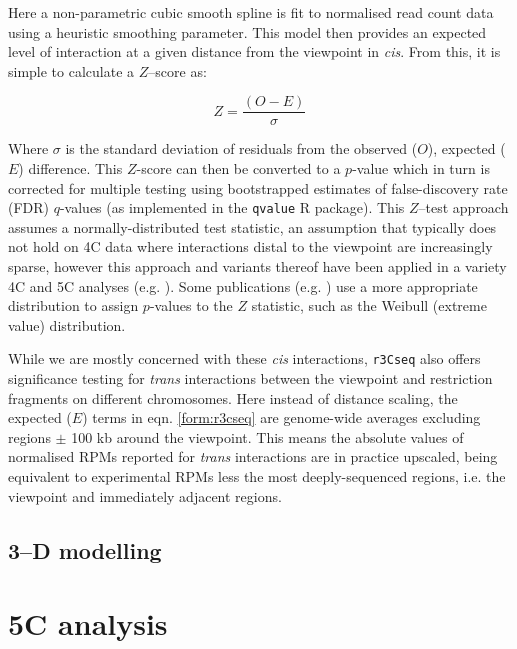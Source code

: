 \documentclass[a4paper,11pt,oneside]{book}
\begin{document}
Here a non-parametric cubic smooth spline is fit to normalised read count data using a heuristic smoothing parameter. This model then provides an expected level of interaction at a given distance from the viewpoint in \emph{cis}. From this, it is simple to calculate a $Z$--score as:

\begin{equation}\label{form:r3cseq}
Z = \frac{(O-E)}{\sigma}
\end{equation}

\noindent Where $\sigma$ is the standard deviation of residuals from the observed ($O$), expected ($E$) difference. This $Z$-score can then be converted to a $p$-value which in turn is corrected for multiple testing using bootstrapped estimates of false-discovery rate (FDR) $q$-values\cite{Storey2004} (as implemented in the \texttt{qvalue} R package\cite{qvalue}). This $Z$--test approach assumes a normally-distributed test statistic, an assumption that typically does not hold on 4C data where interactions distal to the viewpoint are increasingly sparse, however this approach and variants thereof have been applied in a variety 4C and 5C analyses (e.g. ). Some publications (e.g. ) use a more appropriate distribution to assign $p$-values to the $Z$ statistic, such as the Weibull (extreme value) distribution.

While we are mostly concerned with these \emph{cis} interactions, \texttt{r3Cseq} also offers significance testing for \emph{trans} interactions between the viewpoint and restriction fragments on different chromosomes. Here instead of distance scaling, the expected ($E$) terms in eqn. \ref{form:r3cseq} are genome-wide averages excluding regions $\pm$ 100 kb around the viewpoint.\cite{Thongjuea2013} This means the absolute values of normalised RPMs reported for \emph{trans} interactions are in practice upscaled, being equivalent to experimental RPMs less the most deeply-sequenced regions, i.e. the viewpoint and immediately adjacent regions.

\subsection{3--D modelling}\label{methods:3dmodelling}

\section{5C analysis}\label{methods:5c}
\end{document}
